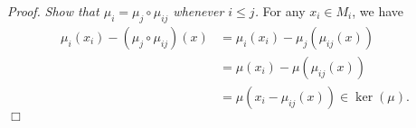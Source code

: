 \documentclass{article}
\begin{document}
\emph{Proof.}
  \emph{Show that $\mu_i = \mu_j \circ \mu_{ij}$ whenever $i \leq j$.}
  For any $x_i \in M_i$, we have
  \begin{align*}
    \mu_i(x_i) - (\mu_j \circ \mu_{ij})(x)
    &= \mu_i(x_i) - \mu_j(\mu_{ij}(x)) \\
    &= \mu(x_i) - \mu(\mu_{ij}(x)) \\
    &= \mu(x_i - \mu_{ij}(x)) \in \ker(\mu).
  \end{align*}
$\Box$ \\\\



\end{document}
